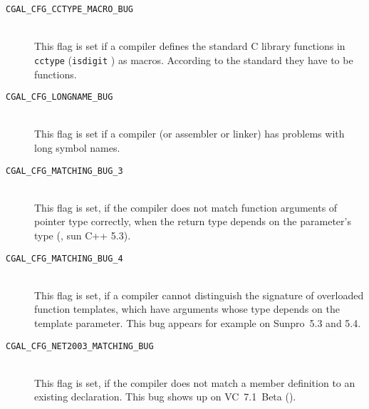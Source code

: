 \begin{description}
\item[{\tt CGAL\_CFG\_CCTYPE\_MACRO\_BUG}]~\\
 This flag is set if a compiler defines the standard C library
 functions in {\tt cctype} ({\tt isdigit} \etc) as macros.  According
 to the standard they have to be functions.
 
\item[{\tt CGAL\_CFG\_LONGNAME\_BUG}]~\\
 This flag is set if a compiler (or assembler or linker) has problems 
 with long symbol names. 

\item[{\tt CGAL\_CFG\_MATCHING\_BUG\_3}]~\\
 This flag is set, if the compiler does not match function arguments
 of pointer type correctly, when the return type depends on the
 parameter's type (\eg, sun C++ 5.3).

\item[{\tt CGAL\_CFG\_MATCHING\_BUG\_4}]~\\
 This flag is set, if a compiler cannot distinguish the signature of
 overloaded function templates, which have arguments whose type
 depends on the template parameter.  This bug appears for example on
 Sunpro~5.3 and 5.4.

\item[{\tt CGAL\_CFG\_NET2003\_MATCHING\_BUG}]~\\
 This flag is set, if the compiler does not match a member definition
 to an existing declaration. This bug shows up on VC~7.1~Beta
 ().


\end{description}
